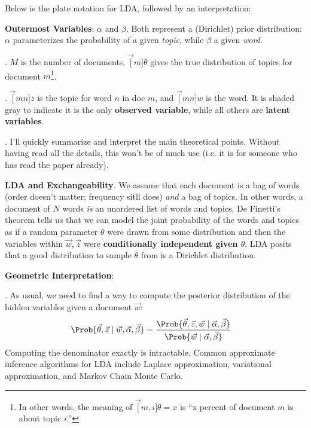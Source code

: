 \documentclass[11pt]{article}
\begin{document}
\p Below is the plate notation for LDA, followed by an interpretation:


\begin{compactitem}
	\item \textbf{Outermost Variables}: $\alpha$ and $\beta$. Both represent a (Dirichlet) prior distribution: $\alpha$ parameterizes the probability of a given \textit{topic}, while $\beta$ a given \textit{word}. 
	
	\item {}. $M$ is the number of documents, $\vec[m]{\theta}$ gives the true distribution of topics for document $m$\footnote{In other words, the meaning of $\vec[m,i]{\theta} = x$ is ``x percent of document $m$ is about topic $i$.''}.
	
	\item {}. $\vec[mn]{z}$ is the topic for word $n$ in doc $m$, and $\vec[mn]{w}$ is the word. It is shaded gray to indicate it is the only \textbf{observed variable}, while all others are \textbf{latent variables}. 
\end{compactitem}



\myspace
\p {}. I'll quickly summarize and interpret the main theoretical points. Without having read all the details, this won't be of much use (i.e. it is for someone who has read the paper already). 
\begin{compactitem}
	\item \textbf{LDA and Exchangeability}. We assume that each document is a bag of words (order doesn't matter; frequency sitll does) \textit{and} a bag of topics. In other words, a document of $N$ words \textit{is} an unordered list of words and topics. De Finetti's theorem tells us that we can model the joint probability of the words and topics as if a random parameter $\theta$ were drawn from some distribution and then the variables within $\vec{w},\vec{z}$ were \textbf{conditionally independent given $\theta$}. LDA posits that a good distribution to sample $\theta$ from is a Dirichlet distribution.
	
	\item \textbf{Geometric Interpretation}: 
\end{compactitem}

\myspace
\p {}. As usual, we need to find a way to compute the posterior distribution of the hidden variables given a document $\vec{w}$:
\begin{align}
\Prob{\vec{\theta}, \vec{z} \mid \vec{w}, \vec{\alpha}, \vec{\beta}} 
&= \frac{ 	\Prob{\vec{\theta}, \vec{z}, \vec{w} \mid \vec{\alpha}, \vec{\beta}}  }{ \Prob{ \vec{w} \mid \vec{\alpha}, \vec{\beta}}     }
\end{align}
Computing the denominator exactly is intractable. Common approximate inference algorithms for LDA include Laplace approximation, variational approximation, and Markov Chain Monte Carlo.
\end{document}
